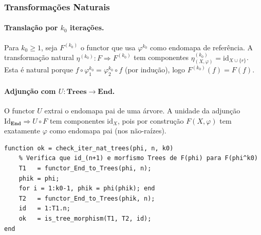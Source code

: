 \subsubsection{Transformações Naturais}

\paragraph{Translação por $k_0$ iterações.}
Para $k_0 \geq 1$, seja $F^{(k_0)}$ o functor que usa $\varphi^{k_0}$ como endomapa de referência. A transformação natural $\eta^{(k_0)}: F \Rightarrow F^{(k_0)}$ tem componentes $\eta^{(k_0)}_{(X,\varphi)} = \mathrm{id}_{X \cup \{r\}}$. Esta é natural porque $f \circ \varphi_1^{k_0} = \varphi_2^{k_0} \circ f$ (por indução), logo $F^{(k_0)}(f) = F(f)$.

\paragraph{Adjunção com $U: \mathbf{Trees} \to \mathbf{End}$.}
O functor $U$ extrai o endomapa pai de uma árvore. A unidade da adjunção $\mathrm{Id}_{\mathbf{End}} \Rightarrow U \circ F$ tem componentes $\mathrm{id}_X$, pois por construção $F(X,\varphi)$ tem exatamente $\varphi$ como endomapa pai (nos não-raízes).

\begin{lstlisting}[style=matlab, caption={Verificação da naturalidade $\eta^{(k_0)}: F \Rightarrow F^{(k_0)}$}]
function ok = check_iter_nat_trees(phi, n, k0)
    % Verifica que id_(n+1) e morfismo Trees de F(phi) para F(phi^k0)
    T1   = functor_End_to_Trees(phi, n);
    phik = phi;
    for i = 1:k0-1, phik = phi(phik); end
    T2   = functor_End_to_Trees(phik, n);
    id   = 1:T1.n;
    ok   = is_tree_morphism(T1, T2, id);
end
\end{lstlisting}